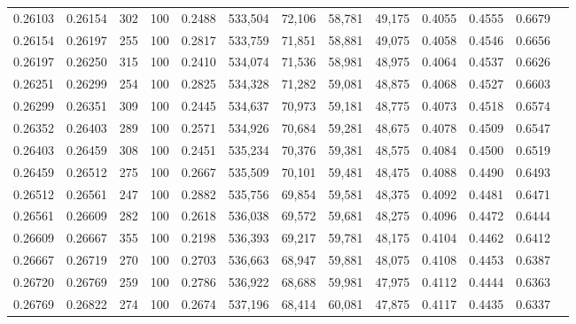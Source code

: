 \begin{tabular}{rrrrrrrrrrrrr}
0.26103 & 0.26154 &   302 & 100 &                                     0.2488 & 533,504 &  72,106 &  58,781 &  49,175 & 0.4055 & 0.4555 & 0.6679 \\
0.26154 & 0.26197 &   255 & 100 &                                     0.2817 & 533,759 &  71,851 &  58,881 &  49,075 & 0.4058 & 0.4546 & 0.6656 \\
0.26197 & 0.26250 &   315 & 100 &                                     0.2410 & 534,074 &  71,536 &  58,981 &  48,975 & 0.4064 & 0.4537 & 0.6626 \\
0.26251 & 0.26299 &   254 & 100 &                                     0.2825 & 534,328 &  71,282 &  59,081 &  48,875 & 0.4068 & 0.4527 & 0.6603 \\
0.26299 & 0.26351 &   309 & 100 &                                     0.2445 & 534,637 &  70,973 &  59,181 &  48,775 & 0.4073 & 0.4518 & 0.6574 \\
0.26352 & 0.26403 &   289 & 100 &                                     0.2571 & 534,926 &  70,684 &  59,281 &  48,675 & 0.4078 & 0.4509 & 0.6547 \\
0.26403 & 0.26459 &   308 & 100 &                                     0.2451 & 535,234 &  70,376 &  59,381 &  48,575 & 0.4084 & 0.4500 & 0.6519 \\
0.26459 & 0.26512 &   275 & 100 &                                     0.2667 & 535,509 &  70,101 &  59,481 &  48,475 & 0.4088 & 0.4490 & 0.6493 \\
0.26512 & 0.26561 &   247 & 100 &                                     0.2882 & 535,756 &  69,854 &  59,581 &  48,375 & 0.4092 & 0.4481 & 0.6471 \\
0.26561 & 0.26609 &   282 & 100 &                                     0.2618 & 536,038 &  69,572 &  59,681 &  48,275 & 0.4096 & 0.4472 & 0.6444 \\
0.26609 & 0.26667 &   355 & 100 &                                     0.2198 & 536,393 &  69,217 &  59,781 &  48,175 & 0.4104 & 0.4462 & 0.6412 \\
0.26667 & 0.26719 &   270 & 100 &                                     0.2703 & 536,663 &  68,947 &  59,881 &  48,075 & 0.4108 & 0.4453 & 0.6387 \\
0.26720 & 0.26769 &   259 & 100 &                                     0.2786 & 536,922 &  68,688 &  59,981 &  47,975 & 0.4112 & 0.4444 & 0.6363 \\
0.26769 & 0.26822 &   274 & 100 &                                     0.2674 & 537,196 &  68,414 &  60,081 &  47,875 & 0.4117 & 0.4435 & 0.6337 \\

\end{tabular}
